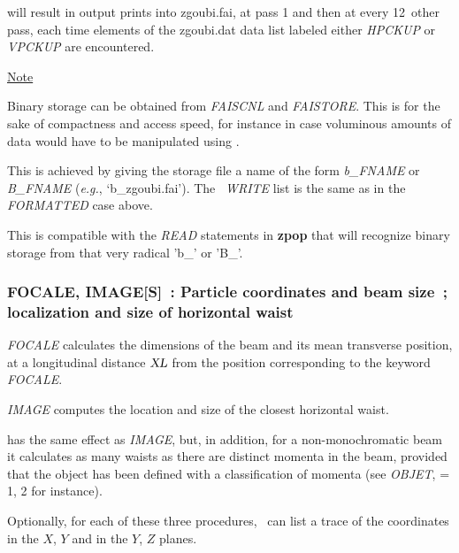 \noindent will result in output prints into zgoubi.fai, at pass 1 and then at every 12~other 
pass, each time elements of the zgoubi.dat  data list labeled either \textsl{HPCKUP}
or \textsl{VPCKUP} are encountered.

\medskip

\noindent\underline{Note}
\medskip 

\noindent Binary storage can be obtained from \textsl{FAISCNL} and \textsl{FAISTORE}. This is for 
the sake of compactness and access speed, for instance  in case  voluminous amounts of 
data would have to be manipulated using \zpop. 

\medskip 
\noindent This is achieved by giving the storage file a name of the form \textsl{b\_FNAME} 
or \textsl{B\_FNAME}  (\emph{e.g.}, `b\_zgoubi.fai'). The \FORTRAN\ \textsl{WRITE} list 
is the same as in the \textsl{FORMATTED} case above.  

\medskip
\noindent This is compatible with the \textsl{READ} statements in \textbf{zpop} that will recognize binary storage 
from that very radical 'b\_' or 'B\_'. 



\newpage

\subsubsection*{FOCALE, IMAGE[S]~: Particle coordinates and beam size~;  localization and
size  of  horizontal waist}\label{FOCALE}\label{IMAGE}\label{IMAGES}
\medskip 

\textsl{FOCALE}  calculates the dimensions of the beam and its mean 
transverse position, at a longitudinal distance $ \textsl{XL} $ from the position 
corresponding to the keyword \textsl{FOCALE}.  
\medskip

\noindent\textsl{IMAGE}  computes the location and size
of the closest horizontal waist.  
\medskip

\noindent\IMAGES{}  has the same effect as \textsl{IMAGE},
 but, in addition, for a 
non-monochromatic beam it calculates as many waists as there are distinct momenta in 
the beam, provided that the object has been defined with a classification of momenta 
(see \textsl{OBJET}, \KOBJ = 1, 2  for instance).  
\medskip

\noindent Optionally, for each of these three procedures, \zgou\ can
list a trace of the coordinates in the $ X$, $Y $ and in the $ Y$, $Z $ planes.  
\medskip

